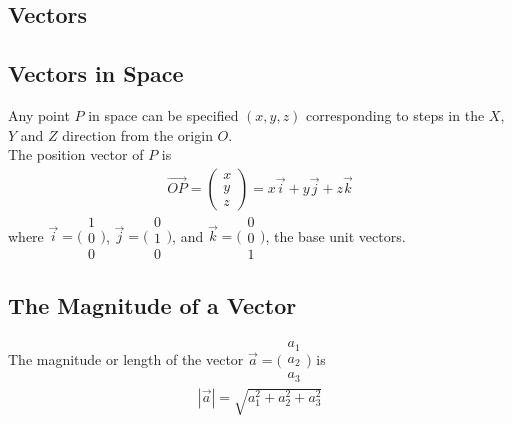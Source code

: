 \documentclass[10pt, a4paper, titlepage]{article}
\begin{document}
\begin{multicols*}{3}
\section{Vectors}
	\subsection{Vectors in Space}
	Any point $P$ in space can be specified $(x,y,z)$ corresponding to steps in the $X$, $Y$ and $Z$ direction from the origin $O$.\\
	The position vector of $P$ is
	\begin{align}
		\overrightarrow{OP}=\begin{pmatrix}x\\ y \\z\end{pmatrix}=x\vec{i}+y\vec{j}+z\vec{k}
	\end{align}
	where $\vec{i}=\big(\begin{smallmatrix}1 \\0 \\0 \end{smallmatrix}\big)$, 
	$\vec{j}=\big(\begin{smallmatrix}0 \\1 \\0 \end{smallmatrix}\big)$, and 
	$\vec{k}=\big(\begin{smallmatrix}0 \\0 \\1 \end{smallmatrix}\big)$, the base unit vectors.

	\dotfill
	\subsection{The Magnitude of a Vector}
	The magnitude or length of the vector $\vec{a}=\big(\begin{smallmatrix}a_1 \\a_2 \\a_3 \end{smallmatrix}\big)$ is
	\begin{align}
		|\vec{a}|=\sqrt{a_1^2+a_2^2+a_3^2}
	\end{align}
	\dotfill

\end{multicols*}
\end{document}
